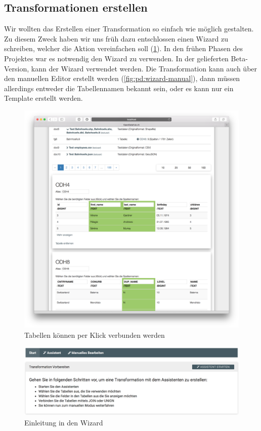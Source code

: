 \subsection{Transformationen erstellen}
Wir wollten das Erstellen einer Transformation so einfach wie möglich gestalten. Zu diesem Zweck haben wir uns früh dazu entschlossen einen Wizard zu schreiben, welcher die Aktion vereinfachen soll (\cref{fig:pd:tables_per_click}). In den frühen Phasen des Projektes war es notwendig den Wizard zu verwenden. In der gelieferten Beta-Version, kann der Wizard verwendet werden. Die Transformation kann auch über den manuellen Editor erstellt werden (\cref{fig:pd:wizard-manual}), dann müssen allerdings entweder die Tabellennamen bekannt sein, oder es kann nur ein Template erstellt werden.
\begin{figure}[H]
\centering
\includegraphics[width=\linewidth]{fig/odhql_wizard_early.png}
\caption{Tabellen können per Klick verbunden werden }
\label{fig:pd:tables_per_click}
\end{figure}
\begin{figure}[H]
\centering
\includegraphics[width=\linewidth]{fig/wizard-step-one.png}
\caption{Einleitung in den Wizard}
\label{fig:pd:wizard-step-one}
\end{figure}
